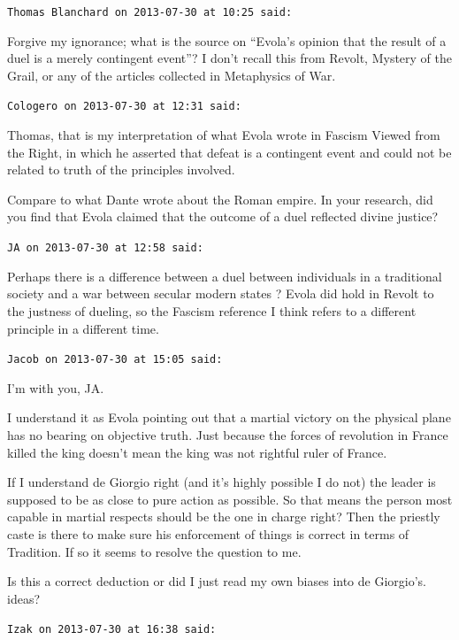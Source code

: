 \begin{footnotesize}
\begin{sffamily}
\texttt{Thomas Blanchard on 2013-07-30 at 10:25 said:}

Forgive my ignorance; what is the source on ``Evola's opinion that the result of a duel is a merely contingent event''? I don't recall this from Revolt, Mystery of the Grail, or any of the articles collected in Metaphysics of War.

\hfill

\texttt{Cologero on 2013-07-30 at 12:31 said:}

Thomas, that is my interpretation of what Evola wrote in Fascism Viewed from the Right, in which he asserted that defeat is a contingent event and could not be related to truth of the principles involved.

Compare to what Dante wrote about the Roman empire. In your research, did you find that Evola claimed that the outcome of a duel reflected divine justice?

\hfill

\texttt{JA on 2013-07-30 at 12:58 said:}

Perhaps there is a difference between a duel between individuals in a traditional society and a war between secular modern states ? Evola did hold in Revolt to the justness of dueling, so the Fascism reference I think refers to a different principle in a different time.

\hfill

\texttt{Jacob on 2013-07-30 at 15:05 said:}

I'm with you, JA.

I understand it as Evola pointing out that a martial victory on the physical plane has no bearing on objective truth. Just because the forces of revolution in France killed the king doesn't mean the king was not rightful ruler of France.

If I understand de Giorgio right (and it's highly possible I do not) the leader is supposed to be as close to pure action as possible. So that means the person most capable in martial respects should be the one in charge right? Then the priestly caste is there to make sure his enforcement of things is correct in terms of Tradition. If so it seems to resolve the question to me.

Is this a correct deduction or did I just read my own biases into de Giorgio's. ideas?

\hfill

\texttt{Izak on 2013-07-30 at 16:38 said:}


\end{sffamily}
\end{footnotesize}
